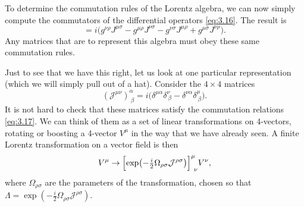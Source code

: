 To determine the commutation rules of the Lorentz algebra, we can now simply
compute the commutators of the differential operators \eqref{eq:3.16}.  The
result is
\begin{equation}
  [J^{\mu\nu}, J^{\rho\sigma}] = i\bigl( g^{\nu\rho}J^{\mu\sigma}
    - g^{\mu\rho}J^{\nu\sigma} - g^{\nu\sigma}J^{\mu\rho}
    + g^{\mu\sigma}J^{\nu\rho} \bigr).
  \label{eq:3.17}
\end{equation}
Any matrices that are to represent this algebra must obey these same
commutation rules.

Just to see that we have this right, let us look at one particular
representation (which we will simply pull out of a hat).  Consider the
$4\times4$ matrices
\begin{equation}
  (\mathcal{J}^{\mu\nu})^{\alpha}_{\ \beta} =
    i\bigl( \delta^{\mu\alpha}\delta^{\nu}_{\ \beta}
      - \delta^{\nu\alpha}\delta^{\mu}_{\ \beta} \bigr).
  \label{eq:3.18}
\end{equation}
It is not hard to check that these matrices satisfy the commutation relations
\eqref{eq:3.17}.  We can think of them as a set of linear transformations on
4-vectors, rotating or boosting a 4-vector $V^\mu$ in the way that we have
already seen.  A finite Lorentz transformation on a vector field is then
\begin{equation}
  V^\mu \to \Bigl[ \exp\bigl(
    -\tfrac{i}{2}\Omega_{\rho\sigma}\mathcal{J}^{\rho\sigma} \bigr)
    \Bigr]^{\mu}_{\ \nu} V^\nu ,
  \label{eq:3.19}
\end{equation}
where $\Omega_{\rho\sigma}$ are the parameters of the transformation, chosen
so that $\Lambda = \exp(-\frac{i}{2}\Omega_{\rho\sigma}\mathcal{J}^{\rho\sigma})$.

